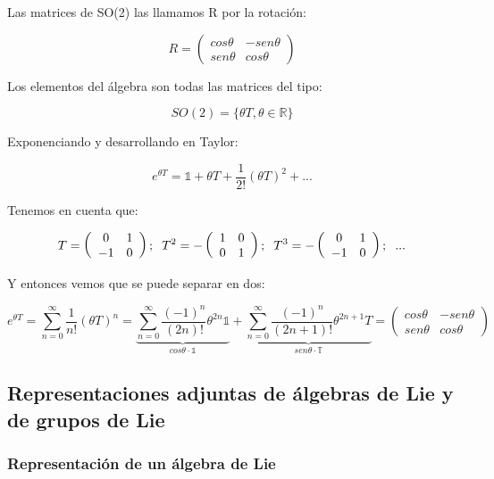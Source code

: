 \documentclass{article}
\begin{document}
Las matrices de SO(2) las llamamos R por la rotación:

$$R= \left ( \begin{array}{cc}
 cos \theta & -sen \theta \\
sen \theta  & cos \theta
\end{array}\right)$$

Los elementos del álgebra son todas las matrices del tipo:

$$SO(2)=\lbrace \theta T , \theta \in \mathds{R} \rbrace$$

Exponenciando y desarrollando en Taylor:

$$e^{\theta T}= \mathds{1} + \theta T + \frac{1}{2!}(\theta T)^2 + ...$$

Tenemos en cuenta que:

$$T=\left ( \begin{array}{cc}
 0 &  1\\
 -1 & 0
\end{array}\right); \hspace{0.2cm} T^2=-\left ( \begin{array}{cc}
 1 &  0\\
 0 & 1
\end{array}\right); \hspace{0.2cm} T^3=-\left ( \begin{array}{cc}
 0 &  1\\
 -1 & 0
\end{array}\right); \hspace{0.2cm} ...$$

Y entonces vemos que se puede separar en dos:

$$e^{\theta T}=\sum _{n=0}^\infty \frac{1}{n!} (\theta T)^n = \underbrace{\sum _{n=0}^\infty \frac{(-1)^{n}}{(2n)!}\theta ^{2n} \mathds{1}}_{cos \theta \cdot \mathds{1}} + \underbrace{ \sum _{n=0}^\infty \frac{(-1)^{n}}{(2n+1)!}\theta ^{2n+1} T}_{sen \theta \cdot \mathds{T}}= \left ( \begin{array}{cc}
 cos \theta & -sen \theta \\
sen \theta  & cos \theta
\end{array}\right) $$


\subsection{Representaciones adjuntas de álgebras de Lie y de grupos de Lie}

\subsubsection{Representación de un álgebra de Lie}
\end{document}
